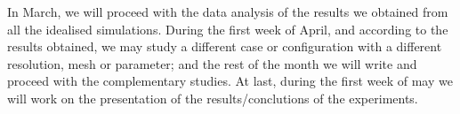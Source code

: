 \documentclass[a4paper,12pt]{article}
\begin{document}
In March, we will proceed with the data analysis of the results we obtained from all the idealised simulations. During the first week of April, and according to the results obtained, we may study a different case or configuration with a different resolution, mesh or parameter; and the rest of the month we will write and proceed with the complementary studies. At last, during the first week of may we will work on the presentation of the results/conclutions of the experiments. 


\end{document}
